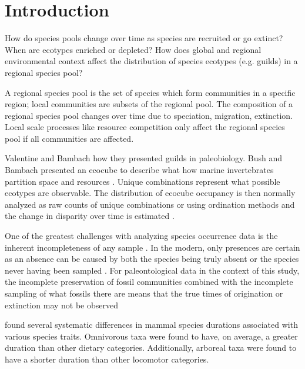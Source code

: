 \documentclass[12pt,letterpaper]{article}
\begin{document}
\section*{Introduction}


How do species pools change over time as species are recruited or go extinct? When are ecotypes enriched or depleted? How does global and regional environmental context affect the distribution of species ecotypes (e.g. guilds) in a regional species pool?

A regional species pool is the set of species which form communities in a specific region; local communities are subsets of the regional pool. The composition of a regional species pool changes over time due to speciation, migration, extinction. Local scale processes like resource competition only affect the regional species pool if all communities are affected.

Valentine and Bambach how they presented guilds in paleobiology. Bush and Bambach presented an ecocube to describe what how marine invertebrates partition space and resources \citep{Bush2007,Bambach2007,Bush2011}. Unique combinations represent what possible ecotypes are observable. The distribution of ecocube occupancy is then normally analyzed as raw counts of unique combinations or using ordination methods and the change in disparity over time is estimated \citep{Bush2007,Bambach2007,Bush2011}.

One of the greatest challenges with analyzing species occurrence data is the inherent incompleteness of any sample \citep{Royle2008,Royle2014,Foote1999a,Foote2001,Lloyd2011,Wang2016b}. In the modern, only presences are certain as an absence can be caused by both the species being truly absent or the species never having been sampled \citep{Royle2008,Royle2014}. For paleontological data in the context of this study, the incomplete preservation of fossil communities combined with the incomplete sampling of what fossils there are means that the true times of origination or extinction may not be observed \citep{Foote1999a,Foote2001,Wang2015,Wang2016b}


\citet{Smits2015b} found several systematic differences in mammal species durations associated with various species traits. Omnivorous taxa were found to have, on average, a greater duration than other dietary categories. Additionally, arboreal taxa were found to have a shorter duration than other locomotor categories. 
\end{document}
